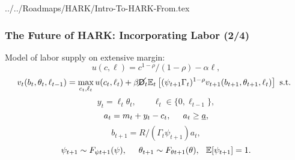 \documentclass[11ptt]{beamer}
\newcommand{\E}{\mathbb{E}}
\newcommand{\Die}{\mathsf{D}}
\newcommand{\Live}{\cancel{\Die}}
\begin{document}
\begin{verbatimwrite}{../../Roadmaps/HARK/Intro-To-HARK-From.tex}
\begin{frame}
\frametitle{The Future of HARK: Incorporating Labor (2/4)}
Model of labor supply on extensive margin:
\begin{equation*}
u(c,\ell) = c^{1-\rho}/(1-\rho) - \alpha \ell,
\end{equation*}
\begin{equation*}
v_t(b_t,\theta_t,\ell_{t-1}) = \max_{c_t, \ell_t} u(c_t,\ell_t) + \beta \Live_t \E_t \left[(\psi_{t+1} \Gamma_t)^{1-\rho} v_{t+1}(b_{t+1},\theta_{t+1},\ell_t) \right] \text{ s.t. }
\end{equation*}
\begin{equation*}
y_t = \ell_t \theta_t, \qquad \ell_t \in \{0,\ell_{t-1}\},
\end{equation*}
\begin{equation*}
a_t = m_t + y_t - c_t, \hspace{0.5cm} a_t \geq \underline{a},
\end{equation*}
\begin{equation*}
b_{t+1} = R/(\Gamma_t \psi_{t+1}) a_t, 
\end{equation*}
\begin{equation*}
\psi_{t+1} \sim F_{\psi t+1}(\psi), \hspace{0.5cm} \theta_{t+1} \sim F_{\theta t+1}(\theta), \hspace{0.25cm} \E[\psi_{t+1}] = 1.
\end{equation*}
\end{frame}




\end{verbatimwrite}
\end{document}
